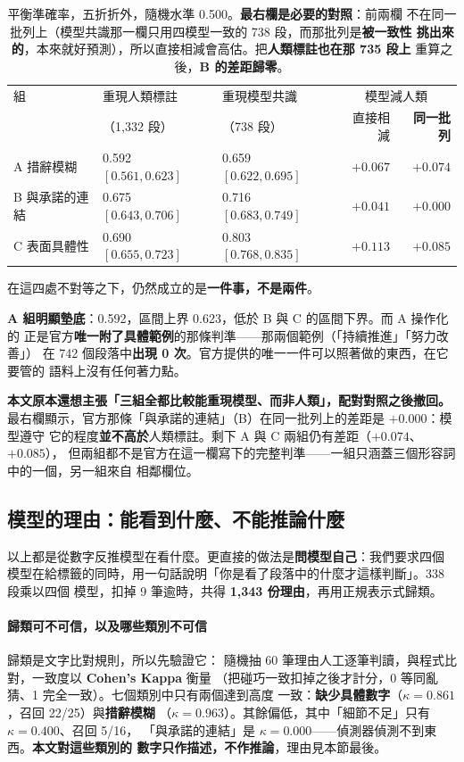 \documentclass[11pt,a4paper]{ctexart}
\begin{document}
\begin{table}[h]
\centering\small
\begin{tabular}{@{}lllrr@{}}
\toprule
組 & 重現人類標註 & 重現模型共識 & \multicolumn{2}{c}{模型減人類} \\
 & （1{,}332 段） & （738 段） & 直接相減 & \textbf{同一批列} \\
\midrule
A 措辭模糊 & 0.592 $[0.561, 0.623]$ & 0.659 $[0.622, 0.695]$ & $+0.067$ & $+0.074$ \\
B 與承諾的連結 & 0.675 $[0.643, 0.706]$ & 0.716 $[0.683, 0.749]$ & $+0.041$ & $\mathbf{+0.000}$ \\
\rowcolor{yellow!15}
C 表面具體性 & 0.690 $[0.655, 0.723]$ & 0.803 $[0.768, 0.835]$ & $+0.113$ & $+0.085$ \\
\bottomrule
\end{tabular}
\caption{平衡準確率，五折折外，隨機水準 0.500。\textbf{最右欄是必要的對照}：前兩欄
不在同一批列上（模型共識那一欄只用四模型一致的 738 段，而那批列是\textbf{被一致性
挑出來的}，本來就好預測），所以直接相減會高估。把\textbf{人類標註也在那 735 段上}
重算之後，\textbf{B 的差距歸零}。}
\end{table}

在這四處不對等之下，仍然成立的是\textbf{一件事，不是兩件}。

\medskip
\textbf{A 組明顯墊底}：0.592，區間上界 0.623，低於 B 與 C 的區間下界。而 A 操作化的
正是官方\textbf{唯一附了具體範例}的那條判準——那兩個範例（「持續推進」「努力改善」）
在 742 個段落中\textbf{出現 0 次}。官方提供的唯一一件可以照著做的東西，在它要管的
語料上沒有任何著力點。

\medskip
\textbf{本文原本還想主張「三組全都比較能重現模型、而非人類」，配對對照之後撤回。}
最右欄顯示，官方那條「與承諾的連結」（B）在同一批列上的差距是 $+0.000$：模型遵守
它的程度\textbf{並不高於}人類標註。剩下 A 與 C 兩組仍有差距（$+0.074$、$+0.085$），
但兩組都不是官方在這一欄寫下的完整判準——一組只涵蓋三個形容詞中的一個，另一組來自
相鄰欄位。

\subsection{模型的理由：能看到什麼、不能推論什麼}
\label{sec:reasons}

以上都是從數字反推模型在看什麼。更直接的做法是\textbf{問模型自己}：我們要求四個
模型在給標籤的同時，用一句話說明「你是看了段落中的什麼才這樣判斷」。338 段乘以四個
模型，扣掉 9 筆逾時，共得 \textbf{1{,}343 份理由}，再用正規表示式歸類。

\paragraph{歸類可不可信，以及哪些類別不可信} 歸類是文字比對規則，所以先驗證它：
隨機抽 60 筆理由人工逐筆判讀，與程式比對，一致度以 \textbf{Cohen's Kappa} 衡量
（把碰巧一致扣掉之後才計分，0 等同亂猜、1 完全一致）。七個類別中只有兩個達到高度
一致：\textbf{缺少具體數字}（$\kappa = 0.861$，召回 22/25）與\textbf{措辭模糊}
（$\kappa = 0.963$）。其餘偏低，其中「細節不足」只有 $\kappa = 0.400$、召回 5/16，
「與承諾的連結」是 $\kappa = 0.000$——偵測器偵測不到東西。\textbf{本文對這些類別的
數字只作描述，不作推論}，理由見本節最後。
\end{document}
